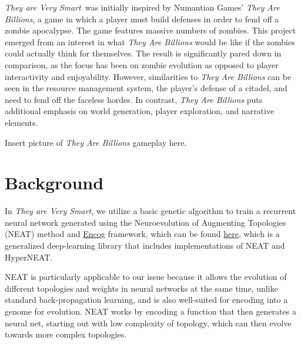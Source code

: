 \documentclass[letterpaper]{article}
\def\tavs{\textit{They are Very Smart}}
\begin{document}

\tavs~was initially inspired by Numantian Games' \textit{They Are Billions}, a game in which a player must build defenses in order to fend off a zombie apocalypse. The game features massive numbers of zombies. This project emerged from an interest in what \textit{They Are Billions} would be like if the zombies could actually think for themselves. The result is significantly pared down in comparison, as the focus has been on zombie evolution as opposed to player interactivity and enjoyability. However, similarities to \textit{They Are Billions} can be seen in the resource management system, the player's defense of a citadel, and need to fend off the faceless hordes. In contrast, \textit{They Are Billions} puts additional emphasis on world generation, player exploration, and narrative elements.

Insert picture of \textit{They Are Billions} gameplay here.

\section{Background}
In \tavs, we utilize a basic genetic algorithm to train a recurrent neural network generated using the Neuroevolution of Augmenting Topologies (NEAT) method and \href{https://www.heatonresearch.com/encog/}{Encog} framework, which can be found \href{https://sharpneat.sourceforge.net/}{here}, which is a generalized deep-learning library that includes implementations of NEAT and HyperNEAT.

NEAT is particularly applicable to our issue because it allows the evolution of different topologies and weights in neural networks at the same time, unlike standard back-propagation learning, and is also well-suited for encoding into a genome for evolution. NEAT works by encoding a function that then generates a neural net, starting out with low complexity of topology, which can then evolve towards more complex topologies.
\end{document}
